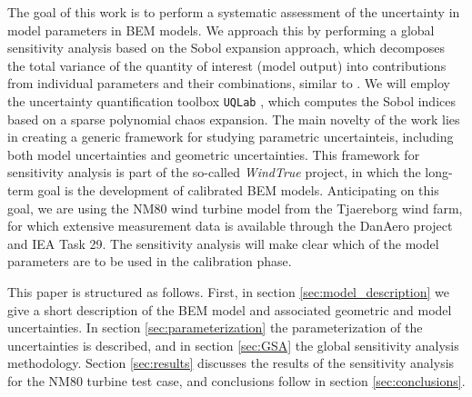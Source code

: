 The goal of this work is to perform a systematic assessment of the uncertainty in model parameters in BEM models. We approach this by performing a global sensitivity analysis based on the Sobol expansion approach, which decomposes the total variance of the quantity of interest (model output) into contributions from individual parameters and their combinations, similar to \cite{Echeverria2017,Murcia2018, Rinker2016a}. We will employ the uncertainty quantification toolbox \texttt{UQLab} \cite{uqlab}, which computes the Sobol indices based on a sparse polynomial chaos expansion. The main novelty of the work lies in creating a generic framework for studying parametric uncertainteis, including both model uncertainties and geometric uncertainties. This framework for sensitivity analysis is part of the so-called \textit{WindTrue} project, in which the long-term goal is the development of calibrated BEM models. Anticipating on this goal, we are using the NM80 wind turbine model from the Tjaereborg wind farm, for which extensive measurement data is available through the DanAero project \cite{Troldborg2013} and IEA Task 29. The sensitivity analysis will make clear which of the model parameters are to be used in the calibration phase.

This paper is structured as follows. First, in section \ref{sec:model_description} we give a short description of the BEM model and associated geometric and model uncertainties. In section \ref{sec:parameterization} the parameterization of the uncertainties is described, and in section \ref{sec:GSA} the global sensitivity analysis methodology. Section \ref{sec:results} discusses the results of the sensitivity analysis for the NM80 turbine test case, and conclusions follow in section \ref{sec:conclusions}.

